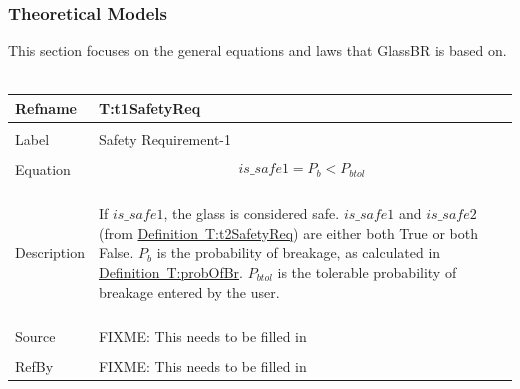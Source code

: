 \documentclass[12pt]{article}
\begin{document}
\subsubsection{Theoretical Models}
\label{Sec:TMs}
This section focuses on the general equations and laws that GlassBR is based on.
~\newline
\noindent \begin{minipage}{\textwidth}
\begin{tabular}{p{} p{}}
\toprule \textbf{Refname} & \textbf{T:t1SafetyReq}
\label{T:t1SafetyReq}
\\ \midrule \\
Label & Safety Requirement-1
\\ \midrule \\
Equation & \begin{dmath}
           is\_safe1={P_{b}}<{P_{btol}}
           \end{dmath}
\\ \midrule \\
Description & \begin{description}
If $is\_safe1$, the glass is considered safe. $is\_safe1$ and $is\_safe2$ (from \hyperref[T:t2SafetyReq]{Definition~T:t2SafetyReq}) are either both True or both False. ${P_{b}}$ is the probability of breakage, as calculated in \hyperref[T:probOfBr]{Definition~T:probOfBr}. ${P_{btol}}$ is the tolerable probability of breakage entered by the user.
              \end{description}
\\ \midrule \\
Source & FIXME: This needs to be filled in
\\ \midrule \\
RefBy & FIXME: This needs to be filled in
\\ \bottomrule \end{tabular}
\end{minipage}\\
~\newline
\end{document}

